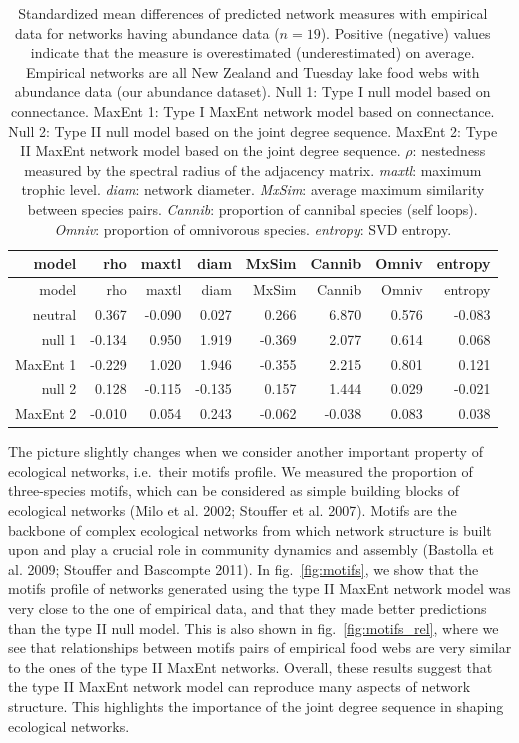 \documentclass[11pt]{article}
\begin{document}
\hypertarget{tbl:measures_abund}{}
\begin{longtable}[]{@{}rrrrrrrr@{}}
\caption{\label{tbl:measures_abund}Standardized mean differences of
predicted network measures with empirical data for networks having
abundance data (\(n = 19\)). Positive (negative) values indicate that
the measure is overestimated (underestimated) on average. Empirical
networks are all New Zealand and Tuesday lake food webs with abundance
data (our abundance dataset). Null 1: Type I null model based on
connectance. MaxEnt 1: Type I MaxEnt network model based on connectance.
Null 2: Type II null model based on the joint degree sequence. MaxEnt 2:
Type II MaxEnt network model based on the joint degree sequence.
\(\rho\): nestedness measured by the spectral radius of the adjacency
matrix. \emph{maxtl}: maximum trophic level. \emph{diam}: network
diameter. \emph{MxSim}: average maximum similarity between species
pairs. \emph{Cannib}: proportion of cannibal species (self loops).
\emph{Omniv}: proportion of omnivorous species. \emph{entropy}: SVD
entropy.}\tabularnewline
\toprule
model & rho & maxtl & diam & MxSim & Cannib & Omniv &
entropy\tabularnewline
\midrule
\endfirsthead
\toprule
model & rho & maxtl & diam & MxSim & Cannib & Omniv &
entropy\tabularnewline
\midrule
\endhead
neutral & 0.367 & -0.090 & 0.027 & 0.266 & 6.870 & 0.576 &
-0.083\tabularnewline
null 1 & -0.134 & 0.950 & 1.919 & -0.369 & 2.077 & 0.614 &
0.068\tabularnewline
MaxEnt 1 & -0.229 & 1.020 & 1.946 & -0.355 & 2.215 & 0.801 &
0.121\tabularnewline
null 2 & 0.128 & -0.115 & -0.135 & 0.157 & 1.444 & 0.029 &
-0.021\tabularnewline
MaxEnt 2 & -0.010 & 0.054 & 0.243 & -0.062 & -0.038 & 0.083 &
0.038\tabularnewline
\bottomrule
\end{longtable}

The picture slightly changes when we consider another important property
of ecological networks, i.e.~their motifs profile. We measured the
proportion of three-species motifs, which can be considered as simple
building blocks of ecological networks (Milo et al. 2002; Stouffer et
al. 2007). Motifs are the backbone of complex ecological networks from
which network structure is built upon and play a crucial role in
community dynamics and assembly (Bastolla et al. 2009; Stouffer and
Bascompte 2011). In fig.~\ref{fig:motifs}, we show that the motifs
profile of networks generated using the type II MaxEnt network model was
very close to the one of empirical data, and that they made better
predictions than the type II null model. This is also shown in
fig.~\ref{fig:motifs_rel}, where we see that relationships between
motifs pairs of empirical food webs are very similar to the ones of the
type II MaxEnt networks. Overall, these results suggest that the type II
MaxEnt network model can reproduce many aspects of network structure.
This highlights the importance of the joint degree sequence in shaping
ecological networks.
\end{document}
